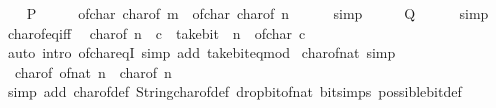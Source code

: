 \begin{isabellebody}
\isanewline
\ \ \isamarkupfalse%
\ {\isacharquery}{\kern0pt}P\isanewline
\ \ \isamarkupfalse%
\ \isamarkupfalse%
\ {\isacartoucheopen}of{\isacharunderscore}{\kern0pt}char\ {\isacharparenleft}{\kern0pt}char{\isacharunderscore}{\kern0pt}of\ m{\isacharparenright}{\kern0pt}\ {\isacharequal}{\kern0pt}\ of{\isacharunderscore}{\kern0pt}char\ {\isacharparenleft}{\kern0pt}char{\isacharunderscore}{\kern0pt}of\ n{\isacharparenright}{\kern0pt}{\isacartoucheclose}\isanewline
\ \ \ \ \isamarkupfalse%
\ simp\isanewline
\ \ \isamarkupfalse%
\ \isamarkupfalse%
\ {\isacharquery}{\kern0pt}Q\isanewline
\ \ \ \ \isamarkupfalse%
\ simp\isanewline
{}\isamarkupfalse%
%
\endisatagproof
{\isafoldproof}%
%
\isadelimproof
\isanewline
%
\endisadelimproof
\isanewline
{}\isamarkupfalse%
\ char{\isacharunderscore}{\kern0pt}of{\isacharunderscore}{\kern0pt}eq{\isacharunderscore}{\kern0pt}iff{\isacharcolon}{\kern0pt}\isanewline
\ \ {\isacartoucheopen}char{\isacharunderscore}{\kern0pt}of\ n\ {\isacharequal}{\kern0pt}\ c\ {\isasymlongleftrightarrow}\ take{\isacharunderscore}{\kern0pt}bit\ {}\ n\ {\isacharequal}{\kern0pt}\ of{\isacharunderscore}{\kern0pt}char\ c{\isacartoucheclose}\isanewline
%
\isadelimproof
\ \ %
\endisadelimproof
%
\isatagproof
{}\isamarkupfalse%
\ {\isacharparenleft}{\kern0pt}auto\ intro{\isacharcolon}{\kern0pt}\ of{\isacharunderscore}{\kern0pt}char{\isacharunderscore}{\kern0pt}eqI\ simp\ add{\isacharcolon}{\kern0pt}\ take{\isacharunderscore}{\kern0pt}bit{\isacharunderscore}{\kern0pt}eq{\isacharunderscore}{\kern0pt}mod{\isacharparenright}{\kern0pt}%
\endisatagproof
{\isafoldproof}%
%
\isadelimproof
\isanewline
%
\endisadelimproof
\isanewline
{}\isamarkupfalse%
\ char{\isacharunderscore}{\kern0pt}of{\isacharunderscore}{\kern0pt}nat\ {\isacharbrackleft}{\kern0pt}simp{\isacharbrackright}{\kern0pt}{\isacharcolon}{\kern0pt}\isanewline
\ \ {\isacartoucheopen}char{\isacharunderscore}{\kern0pt}of\ {\isacharparenleft}{\kern0pt}of{\isacharunderscore}{\kern0pt}nat\ n{\isacharparenright}{\kern0pt}\ {\isacharequal}{\kern0pt}\ char{\isacharunderscore}{\kern0pt}of\ n{\isacartoucheclose}\isanewline
%
\isadelimproof
\ \ %
\endisadelimproof
%
\isatagproof
{}\isamarkupfalse%
\ {\isacharparenleft}{\kern0pt}simp\ add{\isacharcolon}{\kern0pt}\ char{\isacharunderscore}{\kern0pt}of{\isacharunderscore}{\kern0pt}def\ String{\isachardot}{\kern0pt}char{\isacharunderscore}{\kern0pt}of{\isacharunderscore}{\kern0pt}def\ drop{\isacharunderscore}{\kern0pt}bit{\isacharunderscore}{\kern0pt}of{\isacharunderscore}{\kern0pt}nat\ bit{\isacharunderscore}{\kern0pt}simps\ possible{\isacharunderscore}{\kern0pt}bit{\isacharunderscore}{\kern0pt}def{\isacharparenright}{\kern0pt}%

\end{isabellebody}
